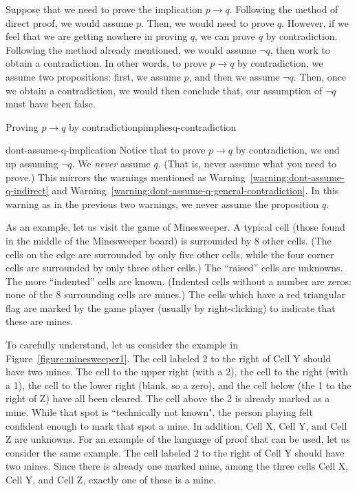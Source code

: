 \documentclass{book}
\theoremstyle{ekimcustom}
\begin{document}
Suppose that we need to prove the implication $p \to q$. Following the method of direct proof, we would assume $p$. Then, we would need to prove $q$. However, if we feel that we are getting nowhere in proving $q$, we can prove $q$ by contradiction. Following the method already mentioned, we would assume $\neg q$, then work to obtain a contradiction. In other words, to prove $p \to q$ by contradiction, we assume two propositions: first, we assume $p$, and then we assume $\neg q$. Then, once we obtain a contradiction, we would then conclude that, our assumption of $\neg q$ must have been false.
\begin{bmethod}{Proving $p \to q$ by contradiction}{pimpliesq-contradiction}
\begin{center}
\end{center}
\end{bmethod}
\begin{bwarning}{}{dont-assume-q-implication}
Notice that to prove $p \to q$ by contradiction, we end up assuming $\neg q$. We \emph{never} assume $q$. (That is, never assume what you need to prove.) This mirrors the warnings mentioned as Warning~\ref{warning:dont-assume-q-indirect} and Warning~\ref{warning:dont-assume-q-general-contradiction}. In this warning as in the previous two warnings, we never assume the proposition $q$.
\end{bwarning}

As an example, let us visit the game of Minesweeper. A typical cell (those found in the middle of the Minesweeper board) is surrounded by 8 other cells. (The cells on the edge are surrounded by only five other cells, while the four corner cells are surrounded by only three other cells.) The ``raised'' cells are unknowns. The more ``indented'' cells are known. (Indented cells without a number are zeros: none of the 8 surrounding cells are mines.) The cells which have a red triangular flag are marked by the game player (usually by right-clicking) to indicate that these are mines.

To carefully understand, let us consider the example in Figure~\ref{figure:minesweeper1}. The cell labeled 2 to the right of Cell Y should have two mines. The cell to the upper right (with a 2), the cell to the right (with a 1), the cell to the lower right (blank, so a zero), and the cell below (the 1 to the right of Z) have all been cleared. The cell above the 2 is already marked as a mine. While that spot is ``technically not known", the person playing felt confident enough to mark that spot a mine. In addition, Cell X, Cell Y, and Cell Z are unknowns. For an example of the language of proof that can be used, let us consider the same example. The cell labeled 2 to the right of Cell Y should have two mines. Since there is already one marked mine, among the three cells Cell X, Cell Y, and Cell Z, exactly one of these is a mine.
\end{document}
